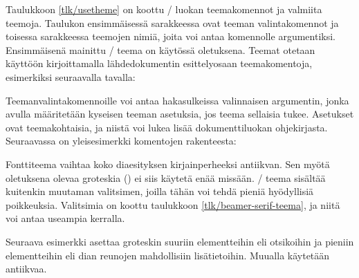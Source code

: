Taulukkoon \ref{tlk/usetheme} on koottu \-/ luokan
teemakomennot ja valmiita teemoja. Taulukon ensimmäisessä sarakkeessa
ovat teeman valintakomennot ja toisessa sarakkeessa teemojen nimiä,
joita voi antaa komennolle argumentiksi. Ensimmäisenä mainittu
\-/ teema on käytössä oletuksena. Teemat otetaan käyttöön
kirjoittamalla lähdedokumentin esittelyosaan teemakomentoja, esimerkiksi
seuraavalla tavalla:

\begin{koodilohkosis}
\end{koodilohkosis}

\noindent
Teemanvalintakomennoille voi antaa hakasulkeissa valinnaisen argumentin,
jonka avulla määritetään kyseisen teeman asetuksia, jos teema sellaisia
tukee. Asetukset ovat teemakohtaisia, ja niistä voi lukea lisää
dokumenttiluokan ohjekirjasta. Seuraavassa on yleisesimerkki komentojen
rakenteesta:

\begin{koodilohkosis}
\end{koodilohkosis}

\noindent
Fonttiteema  vaihtaa koko diaesityksen kirjainperheeksi
antiikvan. Sen myötä oletuksena olevaa groteskia ()
ei siis käytetä enää missään. \-/ teema sisältää kuitenkin
muutaman valitsimen, joilla tähän voi tehdä pieniä hyödyllisiä
poikkeuksia. Valitsimia on koottu taulukkoon
\ref{tlk/beamer-serif-teema}, ja niitä voi antaa useampia kerralla.

Seuraava esimerkki asettaa groteskin suuriin elementteihin eli
otsikoihin ja pieniin elementteihin eli dian reunojen mahdollisiin
lisätietoihin. Muualla käytetään antiikvaa.

\begin{koodilohkosis}
\end{koodilohkosis}


